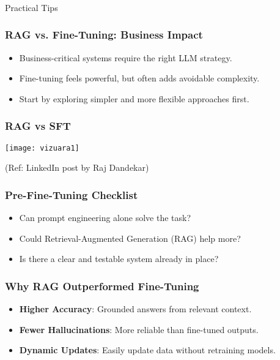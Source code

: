 \begin{frame}[fragile]\frametitle{}
\begin{center}
{\Large Practical Tips}
\end{center}
\end{frame}

\begin{frame}[fragile]\frametitle{RAG vs. Fine-Tuning: Business Impact}
    \begin{itemize}
        \item Business-critical systems require the right LLM strategy.
        \item Fine-tuning feels powerful, but often adds avoidable complexity.
        \item Start by exploring simpler and more flexible approaches first.
    \end{itemize}
\end{frame}

\begin{frame}[fragile]\frametitle{RAG vs SFT}
	
	\begin{center}
	\texttt{[image: vizuara1]}
	\end{center}
	
{\tiny (Ref: LinkedIn post by Raj Dandekar)}

\end{frame}


\begin{frame}[fragile]\frametitle{Pre-Fine-Tuning Checklist}
    \begin{itemize}
        \item Can prompt engineering alone solve the task?
        \item Could Retrieval-Augmented Generation (RAG) help more?
        \item Is there a clear and testable system already in place?
    \end{itemize}
\end{frame}

\begin{frame}[fragile]\frametitle{Why RAG Outperformed Fine-Tuning}
    \begin{itemize}
        \item \textbf{Higher Accuracy}: Grounded answers from relevant context.
        \item \textbf{Fewer Hallucinations}: More reliable than fine-tuned outputs.
        \item \textbf{Dynamic Updates}: Easily update data without retraining models.
    \end{itemize}
\end{frame}

